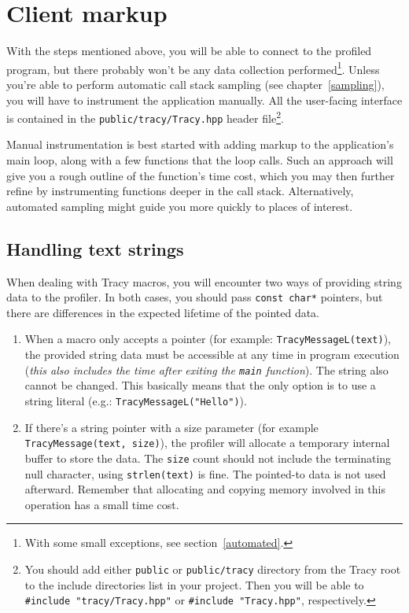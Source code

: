 \documentclass[hidelinks,titlepage,a4paper,twoside]{article}
\begin{document}
\section{Client markup}
\label{client}

With the steps mentioned above, you will be able to connect to the profiled program, but there probably won't be any data collection performed\footnote{With some small exceptions, see section~\ref{automated}.}. Unless you're able to perform automatic call stack sampling (see chapter~\ref{sampling}), you will have to instrument the application manually. All the user-facing interface is contained in the \texttt{public/tracy/Tracy.hpp} header file\footnote{You should add either \texttt{public} or \texttt{public/tracy} directory from the Tracy root to the include directories list in your project. Then you will be able to \texttt{\#include "tracy/Tracy.hpp"} or \texttt{\#include "Tracy.hpp"}, respectively.}.

Manual instrumentation is best started with adding markup to the application's main loop, along with a few functions that the loop calls. Such an approach will give you a rough outline of the function's time cost, which you may then further refine by instrumenting functions deeper in the call stack. Alternatively, automated sampling might guide you more quickly to places of interest.

\subsection{Handling text strings}
\label{textstrings}

When dealing with Tracy macros, you will encounter two ways of providing string data to the profiler. In both cases, you should pass \texttt{const char*} pointers, but there are differences in the expected lifetime of the pointed data.

\begin{enumerate}
\item When a macro only accepts a pointer (for example: \texttt{TracyMessageL(text)}), the provided string data must be accessible at any time in program execution (\emph{this also includes the time after exiting the \texttt{main} function}). The string also cannot be changed. This basically means that the only option is to use a string literal (e.g.: \texttt{TracyMessageL("Hello")}).

\item If there's a string pointer with a size parameter (for example \texttt{TracyMessage(text, size)}), the profiler will allocate a temporary internal buffer to store the data. The \texttt{size} count should not include the terminating null character, using \texttt{strlen(text)} is fine. The pointed-to data is not used afterward. Remember that allocating and copying memory involved in this operation has a small time cost.
\end{enumerate}
\end{document}
